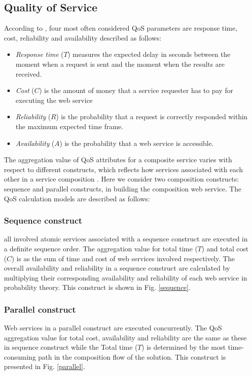 \documentclass{IEEEtran}
\begin{document}
\subsection{Quality of Service}\label{Quality of Service and Composition Constructs}
According to \cite{zeng2003quality}, four most often considered QoS parameters are response time, cost, reliability and availability described as follows:
\begin{itemize}
\item \textit{Response time} ($T$) measures the expected delay in seconds between the moment when a request is sent and the moment when the results are received.
\item \textit{Cost} ($C$) is the amount of money that a service requester has to pay for executing the web service
\item \textit{Reliability} ($R$) is the probability that a request is correctly responded within the maximum expected time frame.
\item \textit{Availability} ($A$) is the probability that a web service is accessible.
\end{itemize}
The aggregation value of QoS attributes for a composite service varies with respect to different constructs, which reflects how services associated with each other in a service composition \cite{zeng2003quality}. Here we consider two composition constructs: sequence and parallel constructs, in building the composition web service. The QoS calculation models are described as follows:
\subsubsection{Sequence construct}
all involved atomic services associated with a sequence construct are executed in a definite sequence order. The aggregation value for total time ($T$) and total cost ($C$) is as the sum of time and cost of web services involved respectively. The overall availability and reliability in a sequence construct are calculated by multiplying their corresponding availability and reliability of each web service in probability theory. This construct is shown in Fig. \ref{sequence}.
\subsubsection{Parallel construct}
Web services in a parallel construct are executed concurrently. The QoS aggregation value for total cost, availability and reliability are the same as these in sequence construct while the Total time ($T$) is determined by the most time-consuming path in the composition flow of the solution. This construct is presented in Fig. \ref{parallel}.
\end{document}
